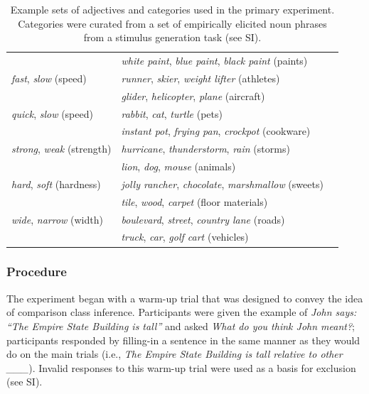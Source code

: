 \documentclass[doc, floatsintext]{apa6}
\begin{document}
\begin{table}[!ht]
\begin{tabularx}{\textwidth}{lll}
								  & \emph{white paint}, \emph{blue paint}, \emph{black paint}  (paints) \\
   \emph{fast}, \emph{slow} (speed)   &  \emph{runner}, \emph{skier}, \emph{weight lifter} (athletes) \\
								  &  \emph{glider}, \emph{helicopter}, \emph{plane} (aircraft) \\
  \emph{quick}, \emph{slow} (speed) &  \emph{rabbit}, \emph{cat}, \emph{turtle} (pets) \\
							  &  \emph{instant pot}, \emph{frying pan}, \emph{crockpot} (cookware) \\
  \emph{strong}, \emph{weak} (strength) &  \emph{hurricane}, \emph{thunderstorm}, \emph{rain} (storms)\\
						  &  \emph{lion}, \emph{dog}, \emph{mouse} (animals)\\
  \emph{hard}, \emph{soft} (hardness) &  \emph{jolly rancher}, \emph{chocolate}, \emph{marshmallow} (sweets)\\
							  &  \emph{tile}, \emph{wood}, \emph{carpet} (floor materials)\\
  \emph{wide}, \emph{narrow} (width) & \emph{boulevard}, \emph{street}, \emph{country lane} (roads) \\
							  & \emph{truck}, \emph{car}, \emph{golf cart} (vehicles) \\
   \hline
\end{tabularx}
\caption{Example sets of adjectives and categories used in the primary experiment.
Categories were curated from a set of empirically elicited noun phrases from a stimulus generation task (see SI).}
\label{tab:1}
\endgroup
\end{table}



\subsubsection{Procedure}

The experiment began with a warm-up trial that was designed to convey the idea of comparison class inference.
Participants were given the example of \emph{John says: ``The Empire State Building is tall''} and asked \emph{What do you think John meant?}; participants responded by filling-in a sentence in the same manner as they would do on the main trials (i.e., \emph{The Empire State Building is tall relative to other \_\_\_}).
Invalid responses to this warm-up trial were used as a basis for exclusion (see SI).
\end{document}
